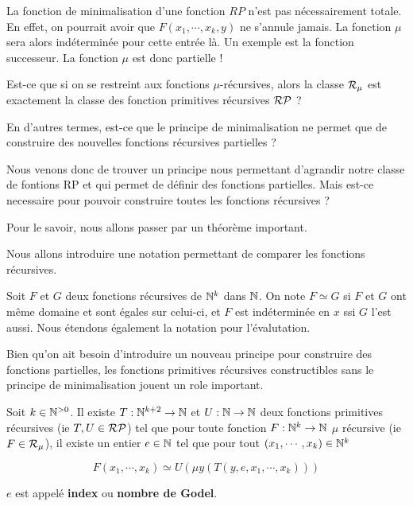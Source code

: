 \begin{remarque}
	La fonction de minimalisation d'une fonction $RP$ n'est pas nécessairement
	totale. En effet, on pourrait avoir que $F(x_{1}, \cdots, x_{k}, y)$ ne
	s'annule jamais. La fonction $\mu$ sera alors indéterminée pour cette entrée
	là. Un exemple est la fonction
	successeur.
	La fonction $\mu$ est donc partielle !
\end{remarque}

\begin{question}
	Est-ce que si on se restreint aux fonctions $\mu$-récursives, alors la
	classe $\mathcal{R}_{\mu}$ est exactement la classe des fonction
	primitives récursives $\mathcal{RP}$ ?

	En d'autres termes, est-ce que le principe de minimalisation ne permet que
	de construire des nouvelles fonctions récursives partielles ?
\end{question}

Nous venons donc de trouver un principe nous permettant d'agrandir notre classe
de fontions RP et qui permet de définir des fonctions partielles. Mais est-ce
necessaire pour pouvoir construire toutes les fonctions récursives ?

Pour le savoir, nous allons passer par un théorème important.

Nous allons introduire une notation permettant de comparer les fonctions
récursives.

\begin{definition}
	Soit $F$ et $G$ deux fonctions récursives de $\mathbb{N}^{k}$ dans $\mathbb{N}$.
	On note $F \simeq G$ si $F$ et $G$ ont même domaine et sont égales sur
	celui-ci, et $F$ est indéterminée en $x$ ssi $G$ l'est aussi. Nous étendons
	également la notation pour l'évalutation.
\end{definition}

Bien qu'on ait besoin d'introduire un nouveau principe pour construire des
fonctions partielles, les fonctions primitives récursives constructibles sans le
principe de minimalisation jouent un role important.

\begin{theorem} 
	\label{theorem:kleene_normal_form}
	Soit $k \in \mathbb{N}^{> 0}$.
	Il existe $T : \mathbb{N}^{k + 2} \rightarrow \mathbb{N}$ et
	$U : \mathbb{N} \rightarrow \mathbb{N}$ deux fonctions primitives récursives
	(ie $T, U \in \mathcal{RP}$) tel que pour toute fonction
	$F : \mathbb{N}^{k} \rightarrow \mathbb{N}$ $\mu$ récursive (ie $F \in
	\mathcal{R}_{\mu}$), il existe un entier $e \in \mathbb{N}$ tel que pour
	tout $(x_{1}, \cdots, x_{k}) \in \mathbb{N}^{k}$

	\begin{equation*}
		F(x_{1}, \cdots, x_{k}) \simeq U(\mu y (T(y, e, x_{1}, \cdots, x_{k})))
	\end{equation*}

	$e$ est appelé \textbf{index} ou \textbf{nombre de Godel}.
\end{theorem}

